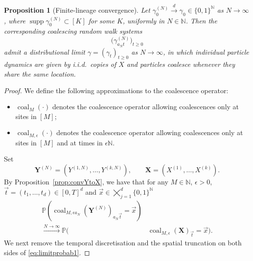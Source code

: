 \documentclass[11pt,a4paper]{scrartcl}
\numberwithin{equation}{section}
\theoremstyle{plain}
\newtheorem{proposition}[theorem]{Proposition}
\theoremstyle{definition}
\theoremstyle{remark}
\DeclareMathOperator{\supp}{supp}
\newcommand{\bN}{\ensuremath{\mathbb{N}}}
\newcommand{\bP}{\ensuremath{\mathbb{P}}}
\begin{document}
\begin{proposition}[Finite-lineage convergence]\label{prop:convYtoXfinite}
Let $\gamma_0^{(N)}\overset{d}{\to}\gamma_0\in\{0,1\}^{\bN}$ as $N\to\infty$, where $\supp \gamma_0^{(N)}\subset[K]$ for some $K$, uniformly in $N\in\bN$. Then the corresponding coalescing random walk systems 
\[
\big(\gamma_{a_N t}^{(N)}\big)_{t\geq 0}
\]
admit a distributional limit $\gamma=(\gamma_{t})_{t\geq 0}$ as $N\to\infty$, in which individual particle dynamics are given by i.i.d.\ copies of $X$ and particles coalesce whenever they share the same location.
\end{proposition}
\begin{proof}
	We define the following approximations to the coalescence operator:
	\begin{itemize}
		\item \(\operatorname{coal}_M(\cdot)\) denotes the coalescence operator allowing coalescences only at sites in $[M]$;
		\item \(\operatorname{coal}_{M,\epsilon}(\cdot)\) denotes the coalescence operator allowing coalescences only at sites in $[M]$ and at times in $\epsilon\bN$.
	\end{itemize}
	Set
	\[
	\mathbf{Y}^{(N)}=(Y^{(1,N)},\dots,Y^{(k,N)}),\qquad \mathbf{X}=(X^{(1)},\dots,X^{(k)}).
	\]
	By Proposition~\ref{prop:convYtoX}, we have that for any $M\in\mathbb{N}$, $\epsilon>0$, $\vec{t}=(t_1,\dots,t_d)\in[0,T]^d$ and $\vec{x}\in \bigtimes_{j=1}^d \{0,1\}^{\bN}$
	\begin{equation}\label{eq:limitprobab1}
		\begin{aligned}
		\bP\left(\operatorname{coal}_{M,\epsilon a_N}(\mathbf{Y}^{(N)})_{a_N\vec{t}}=\vec{x}\right)&\\
		 \overset{N\to\infty}{\longrightarrow}\bP\Big(&\operatorname{coal}_{M,\epsilon}(\mathbf{X})_{\vec{t}}=\vec{x}\Big).
		\end{aligned}
	\end{equation}
	We next remove the temporal discretisation and the spatial truncation on both sides of \eqref{eq:limitprobab1}.


\end{proof}
\end{document}
